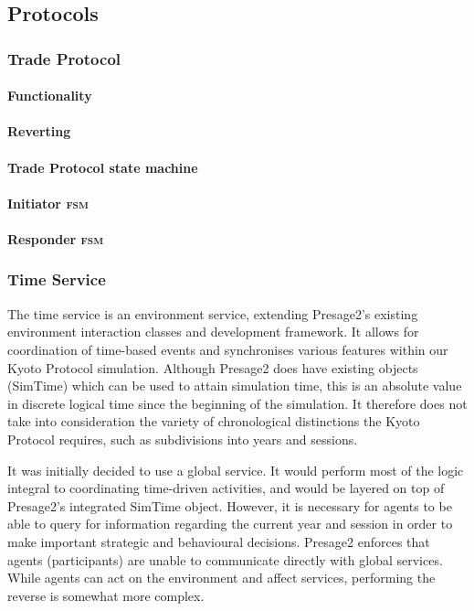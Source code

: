 \subsection{Protocols}

\subsubsection{Trade Protocol}

\paragraph{Functionality}

\paragraph{Reverting}

\paragraph{Trade Protocol state machine}

\paragraph{Initiator \textsc{fsm}}

\paragraph{Responder \textsc{fsm}}

\subsubsection{Time Service}

The time service is an environment service, extending Presage2's existing environment interaction classes and development framework. It allows for coordination of time-based events and synchronises various features within our Kyoto Protocol simulation. Although Presage2 does have existing objects (SimTime) which can be used to attain simulation time, this is an absolute value in discrete logical time since the beginning of the simulation. It therefore does not take into consideration the variety of chronological distinctions the Kyoto Protocol requires, such as subdivisions into years and sessions.

It was initially decided to use a global service. It would perform most of the logic integral to coordinating time-driven activities, and would be layered on top of Presage2's integrated SimTime object. However, it is necessary for agents to be able to query for information regarding the current year and session in order to make important strategic and behavioural decisions. Presage2 enforces that agents (participants) are unable to communicate directly with global services. While agents can act on the environment and affect services, performing the reverse is somewhat more complex.

